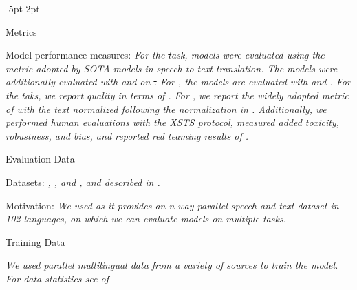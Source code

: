 \begin{adjustwidth}{-5pt}{-2pt}
\begin{singlespace}
\begin{tcolorbox}[title=\textbf{\section{Model Card - \mfourttwo}\label{card:mfourttwo}},
    breakable, sharp corners, boxrule=0.5pt]
\begin{mcsection}{Metrics}
    \item Model performance measures: \textit{For the \st task, \mfourttwo models were evaluated using the \bleu metric adopted by SOTA models in speech-to-text translation. The models were additionally evaluated with \spbleu and \blaser on \st. For \sst, the models are evaluated with \asrbleu and \blaser. For the \mt taks, we report quality in terms of \chrf. For \asr, we report the widely adopted metric of \wer with the text normalized following the normalization in \cite{whisper}.
    Additionally, we performed human evaluations with the XSTS protocol, measured added toxicity, robustness, and bias, and reported red teaming results of \mfourtlgtwo.}
\end{mcsection}


\begin{mcsection}{Evaluation Data}
    \item Datasets: \textit{\fleurs, \flores, \covost and \cvss, \holisticbias and \multilingualholisticbias described in \citet{costa2023multilingual}.
    }
\item Motivation: \textit{We used \fleurs as it provides
an n-way parallel speech and text dataset in 102 languages, on which we can evaluate \mfourttwo models on multiple tasks.}

\end{mcsection}

\begin{mcsection}{Training Data}
\item \textit{We used parallel multilingual data from a variety of sources to train the model. For data statistics see  of \seamlesscitation
}
\end{mcsection}




\end{tcolorbox}
\end{singlespace}
\end{adjustwidth}
